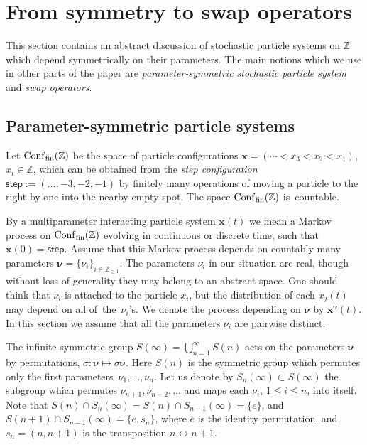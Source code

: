 \section{From symmetry to swap operators}
\label{sec:general_formalism}

This section contains an abstract discussion of
stochastic particle systems on $\mathbb{Z}$ which
depend symmetrically on their parameters.
The main notions which we use in other parts of the
paper are \emph{parameter-symmetric stochastic particle system}
and \emph{swap operators}.

\subsection{Parameter-symmetric particle systems}

Let $\mathrm{Conf}_{\rm fin}(\mathbb{Z})$ be the space of
particle configurations $\mathbf{x}=(\cdots <x_3<x_2<x_1)$,
$x_i\in \mathbb{Z}$,
which can be obtained from the \emph{step configuration}
$\mathsf{step}:=(\ldots,-3,-2,-1 )$
by finitely many operations of moving a particle to the right by one
into the nearby empty spot. The space
$\mathrm{Conf}_{\rm fin}(\mathbb{Z})$ is~countable.

By a multiparameter interacting particle system $\mathbf{x}(t)$
we mean a Markov process on $\mathrm{Conf}_{\rm fin}(\mathbb{Z})$ evolving in continuous
or discrete time,
such that $\mathbf{x}(0)=\mathsf{step}$.
Assume that this Markov process depends on countably many parameters
${\boldsymbol \nu}=\{\nu_i\}_{i\in \mathbb{Z}_{\ge1}}$.
The parameters $\nu_i$ in our situation are real, though without loss of generality
they may belong to an abstract space.
One should think that $\nu_i$ is attached to the particle $x_i$, but the distribution
of each $x_j(t)$ may depend on all of~the~$\nu_i$'s.
We denote the process depending on ${\boldsymbol \nu}$ by $\mathbf{x}^{{\boldsymbol \nu}}(t)$.
In this section we assume that all the parameters $\nu_i$ are pairwise distinct.

The infinite symmetric group
$S(\infty)=\bigcup_{n=1}^{\infty}S(n)$
acts on the parameters ${\boldsymbol \nu}$ by permutations,
$\sigma\colon {\boldsymbol \nu}\mapsto \sigma{\boldsymbol \nu}$.
Here $S(n)$ is the symmetric group which permutes only the
first parame\-ters~$\nu_1,\ldots,\nu_n$.
Let us denote by $S_n(\infty)\subset S(\infty)$
the subgroup which permutes $\nu_{n+1},\nu_{n+2},\ldots $
and maps each $\nu_i$, $1\le i\le n$, into itself. Note that
$S(n)\cap S_n(\infty)=S(n)\cap S_{n-1}(\infty)=\{e\}$,
and~$S(n+1)\cap S_{n-1}(\infty)=\{e,s_{n}\}$,
where $e$ is the identity permutation, and
$s_{n}=(n,n+1)$ is the transposition
$n\leftrightarrow n+1$.

